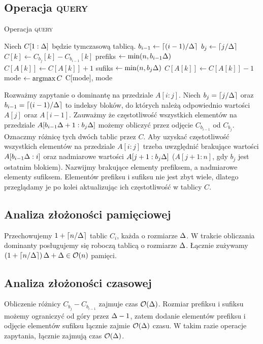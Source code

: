 \subsection{Operacja \textsc{query}}
\begin{algorithm}[H]
    \caption{Operacja \textsc{query}}
    \begin{algorithmic}[1]
            \State Niech $C[1:\Delta]$ będzie tymczasową tablicą.
            \State $b_{i-1} \gets \left\lceil(i-1)/\Delta\right\rceil$
            \State $b_j \gets \left\lceil j/\Delta\right\rceil$
                \State $C[k] \gets C_{b_j}[k] - C_{b_{i-1}}[k]$
            \EndFor
            \State prefiks $\gets \min(n,b_{i-1}\Delta)$
                \State $C[A[k]] \gets C[A[k]]+1$
            \EndFor
            \State sufiks $\gets \min(n, b_j\Delta)$
                \State $C[A[k]] \gets C[A[k]]-1$
            \EndFor
            \State mode $\gets \operatorname*{argmax} C$
            \State \Return C[mode], mode
        \EndFunction
    \end{algorithmic}
\end{algorithm}
Rozważmy zapytanie o dominantę na przedziale $A[i:j]$. Niech $b_j=\left\lceil j / \Delta\right\rceil$ oraz $b_{i-1}=\left\lceil(i-1) / \Delta\right\rceil$ to indeksy bloków, do których należą odpowiednio wartości $A[j]$ oraz $A[i-1]$. Zauważmy że częstotliwość wszystkich elementów na przedziale $A[b_{i-1}\Delta+1:b_j\Delta]$ możemy obliczyć przez odjęcie $C_{b_{i-1}}$ od $C_{b_j}$. Oznaczmy różnicę tych dwóch tablic przez $C$. Aby uzyskać częstotliwość wszystkich elementów na przedziale $A[i:j]$ trzeba uwzględnić brakujące wartości $A[b_{i-1}\Delta:i]$ oraz nadmiarowe wartości $A[j+1:b_j\Delta]$ ($A[j+1:n]$, gdy $b_j$ jest ostatnim blokiem). Nazwijmy brakujące elementy prefiksem, a nadmiarowe elementy sufiksem. Elementów prefiksu i sufiksu nie jest zbyt wiele, dlatego przeglądamy je po kolei aktualizując ich częstotliwość w tablicy $C$.
\subsection{Analiza złożoności pamięciowej}
Przechowujemy $1+\left\lceil n/\Delta\right\rceil$ tablic $C_i$, każda o rozmiarze $\Delta$. W trakcie obliczania dominanty posługujemy się roboczą tablicą o rozmiarze $\Delta$. Łącznie zużywamy $\left(1+\left\lceil n/\Delta\right\rceil\right)\Delta + \Delta \in \mathcal{O}(n)$ pamięci.
\subsection{Analiza złożoności czasowej}
Obliczenie różnicy $C_{b_j} - C_{b_{i-1}}$ zajmuje czas $\mathcal{O}(\Delta)$. Rozmiar prefiksu i sufiksu możemy ograniczyć od góry przez $\Delta-1$, zatem dodanie elementów prefiksu i odjęcie elementów sufiksu łącznie zajmie $\mathcal{O}(\Delta)$ czasu. W takim razie operacje zapytania, łącznie zajmują czas $\mathcal{O}(\Delta)$.
